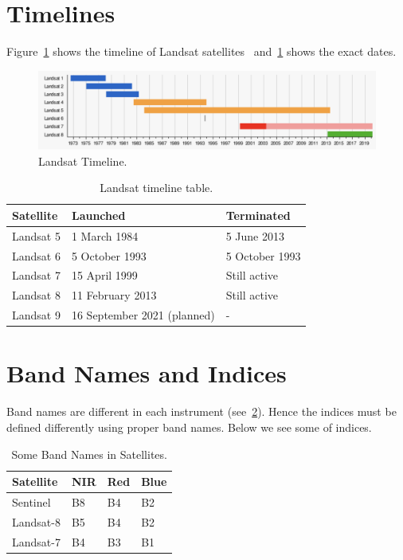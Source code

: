 \documentclass{article}
\begin{document}
\section{Timelines}
\label{sec:Timelines}
Figure~\ref{fig:landsatTimeline}
shows the timeline of Landsat
satellites~\cite{LandsatTimelinesWiki}
and~\cref{tab:ElevationTable} shows the
exact dates.
\begin{figure}[H]
\centering
  \includegraphics[width=1\textwidth]{figures/landsatTimeline1}
\caption{Landsat Timeline.}
\label{fig:landsatTimeline}
\end{figure}

\begin{table}[]
\centering
\caption{Landsat timeline table.} 
\label{tab:ElevationTable}
\begin{tabular}{|l|l|l|}
\hline
\rowcolor{shadecolor} 
\small{Satellite} & 
\small{Launched} & 
\small{Terminated} \\
\hline
Landsat 5 & 1 March 1984 & 5 June 2013 \\ 
\hline
\rowcolor{aliceblue} 
Landsat 6 & 5 October 1993  & 5 October 1993 \\ \hline
Landsat 7 & 15 April 1999 & Still active \\ \hline
\rowcolor{aliceblue} 
Landsat 8 & 11 February 2013 & Still active \\ \hline
Landsat 9 & 16 September 2021 (planned) & - \\ \hline
\end{tabular}
\end{table}

\section{Band Names and Indices}
\label{sec:Band_Names_and_Indices}

Band names are different in each instrument
(see~\cref{tab:BandNameTable}).
Hence the indices must be defined differently
using proper band names.
Below we see some of indices.

\begin{table}[]
\centering
\caption{Some Band Names in Satellites.} 
\label{tab:BandNameTable}
\begin{tabular}{|l|l|l|l|}
\hline
\rowcolor{shadecolor} 
\small{Satellite} & 
\small{NIR} & 
\small{Red}  &
\small{Blue} \\
\hline
Sentinel & B8 & B4 & B2\\ 
\hline
\rowcolor{aliceblue} 
Landsat-8 & B5 & B4 & B2\\ 
\hline
Landsat-7 & B4 & B3 & B1\\ 
\hline
\end{tabular}
\end{table}
\end{document}

